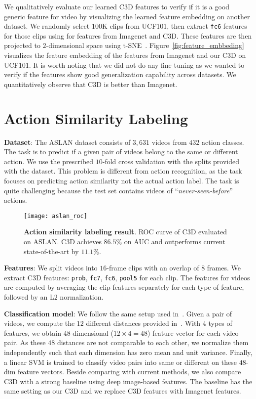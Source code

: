 \documentclass[10pt,twocolumn,letterpaper]{article}
\begin{document}
We qualitatively evaluate our learned C3D features to verify if it is a good generic feature for video by visualizing the learned feature embedding on another dataset. We randomly select $100$K clips from UCF101, then extract \texttt{fc6} features for those clips using for features from Imagenet and C3D. These features are then projected to $2$-dimensional space using t-SNE~\cite{van2008visualizing}. Figure~\ref{fig:feature_embbeding} visualizes the feature embedding of the features from Imagenet and our C3D on UCF101. It is worth noting that we did not do any fine-tuning as we wanted to verify if the features show good generalization capability across datasets. We quantitatively observe that C3D is better than Imagenet. 
\section{Action Similarity Labeling}
\label{sec:aslan}
{\bf Dataset}: The ASLAN dataset consists of $3,631$ videos from $432$ action classes. The task is to predict if a given pair of videos belong to the same or different action. We use the prescribed $10$-fold cross validation with the splits provided with the dataset. This problem is different from action recognition, as the task focuses on predicting action similarity not the actual action label. The task is quite challenging because the test set contains videos of ``\emph{never-seen-before}'' actions.

\begin{figure}
\begin{center}
   \texttt{[image: aslan\_roc]}
\end{center}
\vspace{-12pt}
   \caption{{\bf Action similarity labeling result}. ROC curve of C3D evaluated on ASLAN. C3D achieves $86.5\%$ on AUC and outperforms current state-of-the-art by $11.1\%$.}
\label{fig:aslan_roc}
\end{figure}


{\bf Features}: We split videos into $16$-frame clips with an overlap of $8$ frames. We extract C3D features: \texttt{prob}, \texttt{fc7}, \texttt{fc6}, \texttt{pool5} for each clip. The features for videos are computed by averaging the clip features separately for each type of feature, followed by an L$2$ normalization.

{\bf Classification model}: We follow the same setup used in~\cite{aslanPAMI12}. Given a pair of videos, we compute the $12$ different distances provided in~\cite{aslanPAMI12}. With $4$ types of features, we obtain $48$-dimensional ($12 \times 4 = 48$) feature vector for each video pair. As these $48$ distances are not comparable to each other, we normalize them independently such that each dimension has zero mean and unit variance. Finally, a linear SVM is trained to classify video pairs into same or different on these $48$-dim feature vectors. Beside comparing with current methods, we also compare C3D with a strong baseline using deep image-based features. The baseline has the same setting as our C3D and we replace C3D features with Imagenet features. 
\end{document}

